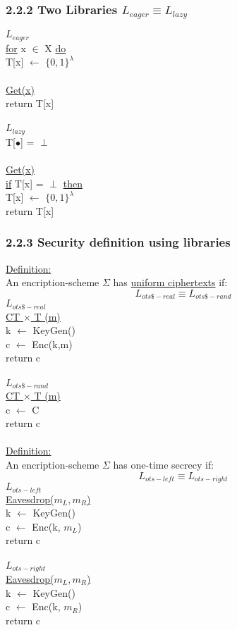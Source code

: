 \documentclass{report}
\begin{document}
 \subsubsection*{2.2.2 Two Libraries $L_{eager} \equiv L_{lazy}$}
 $L_{eager}$ \\
 \underline{for} x $\in$ X \underline{do} \\
 T[x] $\leftarrow$ $\{ 0,1 \} ^{\lambda}$ \\ \\
 \underline{Get(x)} \\
 return T[x] \\ \\ 
 $L_{lazy}$  \\
 T[$\bullet$] = $\perp$ \\ \\
 \underline{Get(x)} \\
 \underline{if} T[x] = $\perp$ \underline{then} \\
 T[x] $\leftarrow$ $\{ 0,1 \} ^{\lambda}$ \\
 return T[x]
 \subsubsection*{2.2.3 Security definition using libraries}
 \underline{Definition:} \\
 An encription-scheme $\Sigma$ has \underline{uniform ciphertexts} if:
 \[
 	L_{ots\$-real} \equiv L_{ots\$-rand}
 \]
 $L_{ots\$-real}$ \\
 \underline{CT $\times$ T (m)} \\
 k $\leftarrow$ KeyGen() \\
 c $\leftarrow$ Enc(k,m) \\
 return c \\ \\
 $L_{ots\$-rand}$ \\
 \underline{CT $\times$ T (m)} \\
 c $\leftarrow$ C \\
 return c \\ \\
 \underline{Definition:} \\
 An encription-scheme $\Sigma$ has one-time secrecy if:
 \[
 	L_{ots-left} \equiv L_{ots-right}
 \]
 $L_{ots-left}$ \\
 \underline{Eavesdrop($m_L, m_R$)} \\
 k $\leftarrow$ KeyGen() \\
 c $\leftarrow$ Enc(k, $m_L$) \\
 return c \\ \\
 $L_{ots-right}$ \\
 \underline{Eavesdrop($m_L, m_R$)} \\
 k $\leftarrow$ KeyGen() \\
 c $\leftarrow$ Enc(k, $m_R$) \\
 return c \\ \\
 
\end{document}
